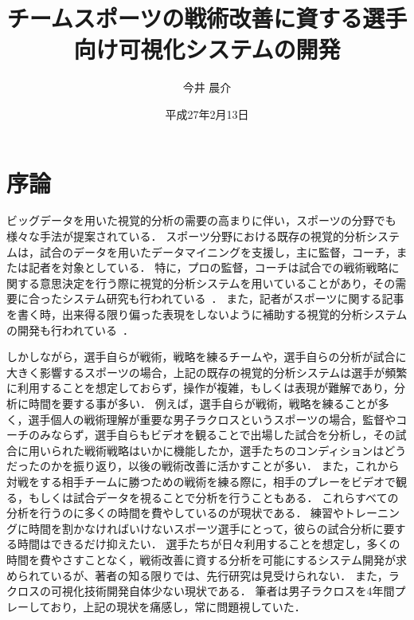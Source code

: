 \documentclass[sotsuron]{kuee}
\title{チームスポーツの戦術改善に資する選手向け可視化システムの開発}
\author{今井 晨介}
\date{平成27年2月13日}
\begin{document}
\maketitle
\tableofcontents


\chapter{序論}
	ビッグデータを用いた視覚的分析の需要の高まりに伴い，スポーツの分野でも様々な手法が提案されている．
	スポーツ分野における既存の視覚的分析システムは，試合のデータを用いたデータマイニングを支援し，主に監督，コーチ，または記者を対象としている．
	特に，プロの監督，コーチは試合での戦術戦略に関する意思決定を行う際に視覚的分析システムを用いていることがあり，その需要に合ったシステム研究も行われている~\cite{SoccerStory,SnapShot,TenniVis}．
	また，記者がスポーツに関する記事を書く時，出来得る限り偏った表現をしないように補助する視覚的分析システムの開発も行われている~\cite{SoccerStory}．
	
	しかしながら，選手自らが戦術，戦略を練るチームや，選手自らの分析が試合に大きく影響するスポーツの場合，上記の既存の視覚的分析システムは選手が頻繁に利用することを想定しておらず，操作が複雑，もしくは表現が難解であり，分析に時間を要する事が多い．
	例えば，選手自らが戦術，戦略を練ることが多く，選手個人の戦術理解が重要な男子ラクロスというスポーツの場合，監督やコーチのみならず，選手自らもビデオを観ることで出場した試合を分析し，その試合に用いられた戦術戦略はいかに機能したか，選手たちのコンディションはどうだったのかを振り返り，以後の戦術改善に活かすことが多い．
	また，これから対戦をする相手チームに勝つための戦術を練る際に，相手のプレーをビデオで観る，もしくは試合データを視ることで分析を行うこともある．
	これらすべての分析を行うのに多くの時間を費やしているのが現状である．
	練習やトレーニングに時間を割かなければいけないスポーツ選手にとって，彼らの試合分析に要する時間はできるだけ抑えたい．
	選手たちが日々利用することを想定し，多くの時間を費やさすことなく，戦術改善に資する分析を可能にするシステム開発が求められているが、著者の知る限りでは、先行研究は見受けられない．
	また，ラクロスの可視化技術開発自体少ない現状である．
	筆者は男子ラクロスを4年間プレーしており，上記の現状を痛感し，常に問題視していた．
	
\end{document}
